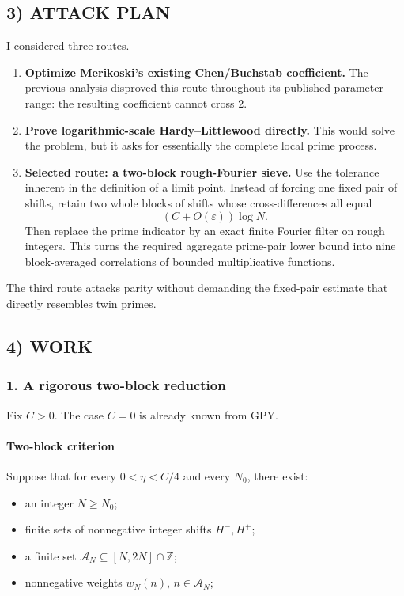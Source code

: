 \subsection*{3) ATTACK PLAN}

I considered three routes.

\begin{enumerate}
\item \textbf{Optimize Merikoski’s existing Chen/Buchstab coefficient.}
The previous analysis disproved this route throughout its published parameter range: the resulting coefficient cannot cross \(2\).

\item \textbf{Prove logarithmic-scale Hardy–Littlewood directly.}
This would solve the problem, but it asks for essentially the complete local prime process.

\item \textbf{Selected route: a two-block rough-Fourier sieve.}
Use the tolerance inherent in the definition of a limit point. Instead of forcing one fixed pair of shifts, retain two whole blocks of shifts whose cross-differences all equal
\[
(C+O(\varepsilon))\log N.
\]
Then replace the prime indicator by an exact finite Fourier filter on rough integers. This turns the required aggregate prime-pair lower bound into nine block-averaged correlations of bounded multiplicative functions.
\end{enumerate}

The third route attacks parity without demanding the fixed-pair estimate that directly resembles twin primes.

\subsection*{4) WORK}

\subsubsection*{1. A rigorous two-block reduction}

Fix \(C>0\). The case \(C=0\) is already known from GPY.

\paragraph{Two-block criterion}

Suppose that for every \(0<\eta<C/4\) and every \(N_0\), there exist:

\begin{itemize}
\item an integer \(N\ge N_0\);
\item finite sets of nonnegative integer shifts \(H^-,H^+\);
\item a finite set \(\mathcal A_N\subseteq[N,2N]\cap\mathbb Z\);
\item nonnegative weights \(w_N(n)\), \(n\in\mathcal A_N\);
\end{itemize}

